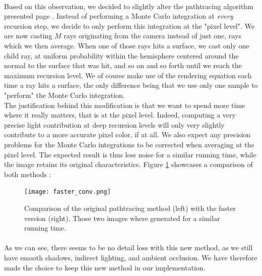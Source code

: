 \documentclass[12pt, oneside]{report}
\begin{document}
\paragraph{}Based on this observation, we decided to slightly alter the pathtracing algorithm presented page \pageref{alg:basics}. Instead of performing a Monte Carlo integration at \emph{every} recursion step, we decide to only perform this integration at the "pixel level". We are now casting $M$ rays originating from the camera instead of just one, rays which we then average. When one of those rays hits a surface, we cast only one child ray, at uniform probability within the hemisphere centered around the normal to the surface that was hit, and so on and so forth until we reach the maximum recursion level. We of course make use of the rendering equation each time a ray hits a surface, the only difference being that we use only one sample to "perform" the Monte Carlo integration.\\
The justification behind this modification is that we want to spend more time where it really matters, that is at the pixel level. Indeed, computing a very precise light contribution at deep recursion levels will only very slightly contribute to a more accurate pixel color, if at all. We also expect any precision problems for the Monte Carlo integrations to be corrected when averaging at the pixel level. The expected result is thus less noise for a similar running time, while the image retains its original characteristics. Figure \ref{fig:fasterConv} showcases a comparison of both methods :

\begin{figure}[h]
    \centering
    \texttt{[image: faster\_conv.png]} 
    \caption{Comparison of the original pathtracing method (left) with the faster version (right). Those two images where generated for a similar running time.}
    \label{fig:fasterConv}
\end{figure}

\paragraph{}As we can see, there seems to be no detail loss with this new method, as we still have smooth shadows, indirect lighting, and ambient occlusion. We have therefore made the choice to keep this new method in our implementation.
\end{document}
